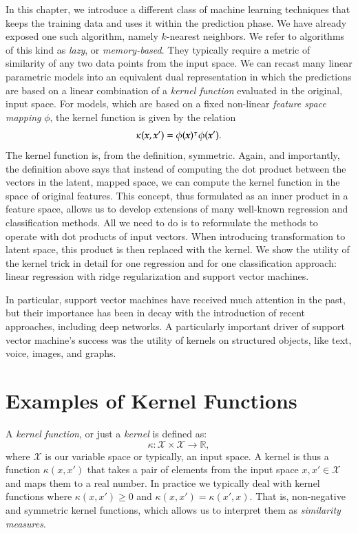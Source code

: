 \begin{refsection}
In this chapter, we introduce a different class of machine learning techniques that keeps the training data and uses it within the prediction phase. We have already exposed one such algorithm, namely $k$-nearest neighbors. We refer to algorithms of this kind as {\em lazy}, or {\em memory-based}. They typically require a metric of similarity of any two data points from the input space. We can recast many linear parametric models into an equivalent dual representation in which the predictions are based on a linear combination of a {\em kernel function} evaluated in the original, input space. For models, which are based on a fixed non-linear {\em feature space mapping} $\phi$, the kernel function is given by the relation
$$ \kappa(\boldsymbol{x},\boldsymbol{x}')=\phi(\boldsymbol{x})^\intercal \phi(\boldsymbol{x}').$$
The kernel function is, from the definition, symmetric. Again, and importantly, the definition above says that instead of computing the dot product between the vectors in the latent, mapped space, we can compute the kernel function in the space of original features.  This concept, thus formulated as an inner product in a feature space, allows us to develop extensions of many well-known regression and classification methods. All we need to do is to reformulate the methods to operate with dot products of input vectors. When introducing transformation to latent space, this product is then replaced with the kernel. We show the utility of the kernel trick in detail for one regression and for one classification approach: linear regression with ridge regularization and support vector machines. 

In particular, support vector machines have received much attention in the past, but their importance has been in decay with the introduction of recent approaches, including deep networks. A particularly important driver of support vector machine's success was the utility of kernels on structured objects, like text, voice, images, and graphs.

\section{Examples of Kernel Functions}

A {\em kernel function}, or just a {\em kernel} is defined as:
$$\kappa: \mathcal{X} \times \mathcal{X} \rightarrow \mathbb{R},$$
where $\mathcal{X}$ is our variable space or typically, an input space. A kernel is thus a function $\kappa(x, x')$ that takes a pair of elements from the input space $x, x' \in \mathcal{X}$ and maps them to a real number. In practice we typically deal with kernel functions where $\kappa(x, x') \geq 0$ and $\kappa(x, x') = \kappa(x', x)$. That is, non-negative and symmetric kernel functions, which allows us to interpret them as \emph{similarity measures}. 


\end{refsection}

